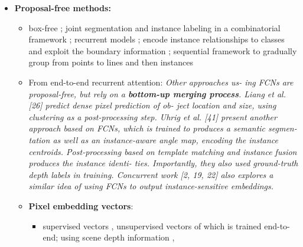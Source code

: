 \begin{itemize}
\item \textbf{Proposal-free methods:} 
\begin{itemize}
\item box-free \cite{pinheiro2015learning,pinheiro2016learning,hu2017fastmask}; joint segmentation and instance labeling in a combinatorial framework \cite{kirillov2017instancecut}; recurrent models \cite{romera2016recurrent,ren2017end}; encode instance relationships to classes and exploit the boundary information  \cite{jin2016object}; sequential framework to gradually group from points to lines and then instances \cite{liu2017sgn}
\item From end-to-end recurrent attention: \textit{Other approaches us- ing FCNs are proposal-free, but rely on a \textbf{bottom-up merging process}\textbf{}. Liang et al. [26] predict dense pixel prediction of ob- ject location and size, using clustering as a post-processing step. Uhrig et al. [41] present another approach based on FCNs, which is trained to produces a semantic segmen- tation as well as an instance-aware angle map, encoding the instance centroids. Post-processing based on template matching and instance fusion produces the instance identi- ties. Importantly, they also used ground-truth depth labels in training. Concurrent work [2, 19, 22] also explores a similar idea of using FCNs to output instance-sensitive embeddings.}
\item \textbf{Pixel embedding vectors}: 
\begin{itemize}
\item supervised vectors \cite{bai2017deep}, unsupervised vectors  \cite{kong2018recurrent,fathi2017semantic,newell2017associative,de2017semantic} of which \cite{kong2018recurrent} is trained end-to-end;  using scene depth information \cite{uhrig2016pixel},  



\end{itemize}
\end{itemize}
\end{itemize}
